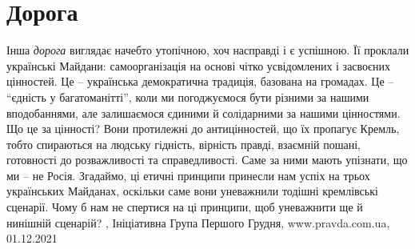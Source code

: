  
 
 
 
 
\chapter{Дорога}

Інша \emph{дорога} виглядає начебто утопічною, хоч насправді і є успішною. Її проклали
українські Майдани: самоорганізація на основі чітко усвідомлених і засвоєних
цінностей. Це – українська демократична традиція, базована на громадах. Це –
\enquote{єдність у багатоманітті}, коли ми погоджуємося бути різними за нашими
вподобаннями, але залишаємося єдиними й солідарними за нашими цінностями.  Що
це за цінності? Вони протилежні до антицінностей, що їх пропагує Кремль, тобто
спираються на людську гідність, вірність правді, взаємній пошані, готовності до
розважливості та справедливості. Саме за ними мають упізнати, що ми – не Росія.
Згадаймо, ці етичні принципи принесли нам успіх на трьох українських Майданах,
оскільки саме вони уневажнили тодішні кремлівські сценарії. Чому б нам не
спертися на ці принципи, щоб уневажнити ще й нинішній сценарій?
, 
Ініціативна Група Першого Грудня, www.pravda.com.ua, 01.12.2021
